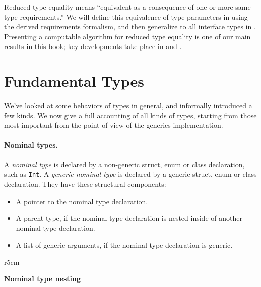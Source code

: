 \documentclass[../generics]{subfiles}
\begin{document}
Reduced type equality means ``equivalent as a consequence of one or more same-type requirements.'' We will define this equivalence of type parameters in  using the derived requirements formalism, and then generalize to all interface types in . Presenting a computable algorithm for reduced type equality is one of our main results in this book; key developments take place in  and .

\section{Fundamental Types}\label{fundamental types}

We've looked at some behaviors of types in general, and informally introduced a few kinds. We now give a full accounting of all kinds of types, starting from those most important from the point of view of the generics implementation.

\paragraph{Nominal types.}
A \emph{nominal type} is declared by a non-generic struct, enum or class declaration, such as \texttt{Int}. A \emph{generic nominal type} is declared by a generic struct, enum or class declaration. They have these structural components:
\begin{itemize}
\item A pointer to the nominal type declaration.
\item A parent type, if the nominal type declaration is nested inside of another nominal type declaration.
\item A list of generic arguments, if the nominal type declaration is generic.
\end{itemize}

\begin{wrapfigure}[9]{r}{5cm}
\begin{center}\textbf{Nominal type nesting}\end{center}
\end{wrapfigure}
\end{document}
